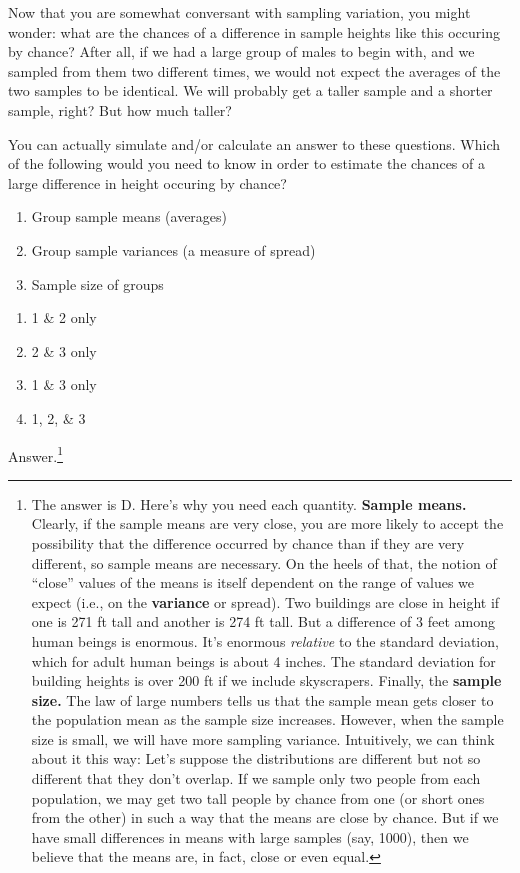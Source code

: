 \documentclass[
  openany]{book}
\providecommand{\tightlist}{%
  \setlength{\itemsep}{0pt}\setlength{\parskip}{0pt}}
\begin{document}
Now that you are somewhat conversant with sampling variation, you might wonder: what are the chances of a difference in sample heights like this occuring by chance? After all, if we had a large group of males to begin with, and we sampled from them two different times, we would not expect the averages of the two samples to be identical. We will probably get a taller sample and a shorter sample, right? But how much taller?

You can actually simulate and/or calculate an answer to these questions. Which of the following would you need to know in order to estimate the chances of a large difference in height occuring by chance?

\begin{enumerate}
\def\labelenumi{\arabic{enumi}.}
\tightlist
\item
  Group sample means (averages)
\item
  Group sample variances (a measure of spread)
\item
  Sample size of groups
\end{enumerate}

\begin{enumerate}
\def\labelenumi{\Alph{enumi})}
\tightlist
\item
  1 \& 2 only
\item
  2 \& 3 only
\item
  1 \& 3 only
\item
  1, 2, \& 3
\end{enumerate}

Answer.\footnote{The answer is D. Here's why you need each quantity. \textbf{Sample means.} Clearly, if the sample means are very close, you are more likely to accept the possibility that the difference occurred by chance than if they are very different, so sample means are necessary. On the heels of that, the notion of ``close'' values of the means is itself dependent on the range of values we expect (i.e., on the \textbf{variance} or spread). Two buildings are close in height if one is 271 ft tall and another is 274 ft tall. But a difference of 3 feet among human beings is enormous. It's enormous \emph{relative} to the standard deviation, which for adult human beings is about 4 inches. The standard deviation for building heights is over 200 ft if we include skyscrapers. Finally, the \textbf{sample size.} The law of large numbers tells us that the sample mean gets closer to the population mean as the sample size increases. However, when the sample size is small, we will have more sampling variance. Intuitively, we can think about it this way: Let's suppose the distributions are different but not so different that they don't overlap. If we sample only two people from each population, we may get two tall people by chance from one (or short ones from the other) in such a way that the means are close by chance. But if we have small differences in means with large samples (say, 1000), then we believe that the means are, in fact, close or even equal.}
\end{document}
